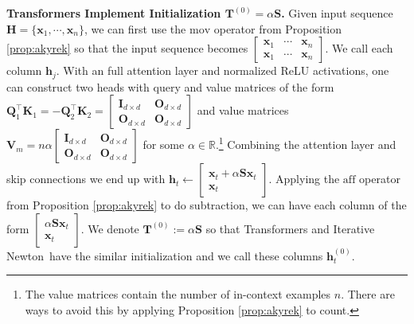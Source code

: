 \documentclass[11pt]{article}
\theoremstyle{plain}
\theoremstyle{definition}
\theoremstyle{remark}
\renewcommand{\^}[1]{^{(#1)}}
\newcommand{\bx}{\boldsymbol{x}}
\newcommand{\bh}{\boldsymbol{h}}
\newcommand{\bK}{\boldsymbol{K}}
\newcommand{\bO}{\boldsymbol{O}}
\newcommand{\bH}{\boldsymbol{H}}
\newcommand{\bQ}{\boldsymbol{Q}}
\newcommand{\bI}{\boldsymbol{I}}
\newcommand{\bS}{\boldsymbol{S}}
\newcommand{\bT}{\boldsymbol{T}}
\newcommand{\bV}{\boldsymbol{V}}
\newcommand{\newton}{Iterative Newton}
\renewcommand{\paragraph}[1]{\vspace{1mm}\noindent\textbf{#1}}
\begin{document}
\paragraph{Transformers Implement Initialization $\bT^{(0)} = \alpha \bS$.} Given input sequence $\bH = \{\bx_1, \cdots, \bx_n \}$, we can first use the $\mathrm{mov}$ operator from Proposition \ref{prop:akyrek} 
so that the input sequence becomes $\begin{bmatrix}
    \bx_1 & \cdots & \bx_n \\
    \bx_1 & \cdots & \bx_n 
\end{bmatrix}$. We call each column $\bh_j$. With an full attention layer and normalized ReLU activations, one can construct two heads with query and value matrices of the form $\bQ_1^\top \bK_1 = -\bQ_2^\top \bK_2 = \begin{bmatrix}
    \bI_{d \times d} & \bO_{d \times d} \\
    \bO_{d \times d} & \bO_{d \times d}
\end{bmatrix}$ and value matrices $\bV_m =n \alpha \begin{bmatrix}
    \bI_{d \times d} & \bO_{d \times d} \\
    \bO_{d \times d} & \bO_{d \times d}
\end{bmatrix}$  for some $\alpha \in \mathbb R$.\footnote{The value matrices contain the number of in-context examples $n$. There are ways to avoid this by applying Proposition \ref{prop:akyrek} to count.} Combining the attention layer and skip connections we end up with $\bh_t \leftarrow \begin{bmatrix}
        \bx_t + \alpha \bS \bx_t \\ \bx_t
\end{bmatrix} $. Applying the $\mathrm{aff}$ operator from Proposition \ref{prop:akyrek} to do subtraction, we can have each column of the form $\begin{bmatrix}
        \alpha \bS \bx_t \\ \bx_t
\end{bmatrix}$. We denote $\bT^{(0)} :=  \alpha \bS$ so that Transformers and \newton\ have the similar initialization and we call these columns $\bh_t^{(0)}$.  
\end{document}
